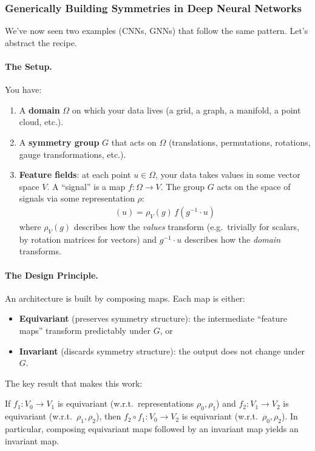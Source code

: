 \subsubsection{Generically Building Symmetries in Deep Neural Networks}

We've now seen two examples (CNNs, GNNs) that follow the same pattern. Let's abstract
the recipe.

\paragraph{The Setup.}
You have:
\begin{enumerate}
    \item A \textbf{domain} $\Omega$ on which your data lives (a grid, a graph, a
    manifold, a point cloud, etc.).
    \item A \textbf{symmetry group} $G$ that acts on $\Omega$
    (translations, permutations, rotations, gauge transformations, etc.).
    \item \textbf{Feature fields}: at each point $u \in \Omega$, your data takes values
    in some vector space $V$. A ``signal'' is a map $f: \Omega \to V$. The group $G$
    acts on the space of signals via some representation $\rho$:
    \begin{align}
        [\rho(g) f](u) = \rho_V(g) \, f(g^{-1} \cdot u)
    \end{align}
    where $\rho_V(g)$ describes how the \emph{values} transform (e.g.\ trivially for
    scalars, by rotation matrices for vectors) and $g^{-1} \cdot u$ describes how the
    \emph{domain} transforms.
\end{enumerate}

\paragraph{The Design Principle.}
An architecture is built by composing maps. Each map is either:
\begin{itemize}
    \item \textbf{Equivariant} (preserves symmetry structure): the intermediate
    ``feature maps'' transform predictably under $G$, or
    \item \textbf{Invariant} (discards symmetry structure): the output does not change
    under $G$.
\end{itemize}
The key result that makes this work:

\begin{fact}
    If $f_1: V_0 \to V_1$ is equivariant (w.r.t.\ representations $\rho_0, \rho_1$)
    and $f_2: V_1 \to V_2$ is equivariant (w.r.t.\ $\rho_1, \rho_2$), then
    $f_2 \circ f_1: V_0 \to V_2$ is equivariant (w.r.t.\ $\rho_0, \rho_2$).
    In particular, composing equivariant maps followed by an invariant map yields an
    invariant map.
\end{fact}

